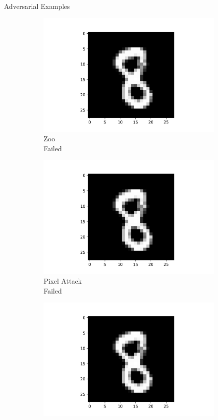 \documentclass[9pt]{beamer}
\begin{document}
\begin{frame}{Adversarial Examples}
\begin{figure}
\begin{subfigure}[t]{0.23\linewidth}
        \includegraphics[width=\linewidth]{images/Zoo_8.png}
        \caption{Zoo\\Failed}
    \end{subfigure}
    \begin{subfigure}[t]{0.23\linewidth}
        \centering
        \captionsetup{justification=centering}
        \includegraphics[width=\linewidth]{images/PixelAttack_8.png}
        \caption{Pixel Attack\\Failed}
    \end{subfigure}
    \begin{subfigure}[t]{0.23\linewidth}
        \centering
        \captionsetup{justification=centering}
        \includegraphics[width=\linewidth]{images/clean_8.png}

\end{subfigure}
\end{figure}
\end{frame}
\end{document}
